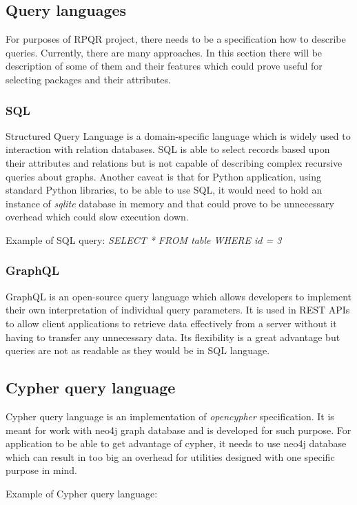 \subsection*{Query languages}
For purposes of RPQR project, there needs to be a specification how to describe queries. Currently,
there are many approaches. In this section there will be description of some of them and their features
which could prove useful for selecting packages and their attributes.

\subsubsection*{SQL}
Structured Query Language\cite{SQL} is a domain-specific language which is widely used to interaction with
relation databases. SQL is able to select records based upon their attributes and relations but
is not capable of describing complex recursive queries about graphs. Another caveat is that for Python
application, using standard Python libraries, to be able to use SQL, it would need to hold an instance of \textit{sqlite} database in memory and
that could prove to be unnecessary overhead which could slow execution down.

Example of SQL query:
\textit{SELECT * FROM table WHERE id = 3}

\subsubsection*{GraphQL}
GraphQL\cite{GraphQL} is an open-source query language which allows developers to implement their own interpretation
of individual query parameters. It is used in REST APIs to allow client applications to retrieve data
effectively from a server without it having to transfer any unnecessary data. Its flexibility is
a great advantage but queries are not as readable as they would be in SQL language.

\subsection*{Cypher query language}
Cypher query language is an implementation of \textit{opencypher} specification. It is meant for work with
neo4j graph database and is developed for such purpose. For application to be able to get advantage
of cypher, it needs to use neo4j database which can result in too big an overhead for utilities
designed with one specific purpose in mind.

Example of Cypher query language:

